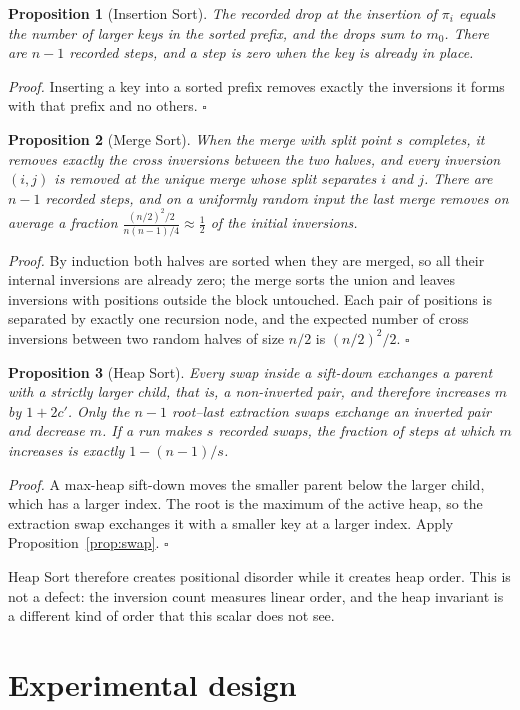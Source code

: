 \documentclass[10pt,journal]{IEEEtran}
\newtheorem{proposition}{Proposition}
\begin{document}
\begin{proposition}[Insertion Sort]
The recorded drop at the insertion of $\pi_i$ equals the number of larger keys in the sorted prefix, and the drops sum to $m_0$. There are $n-1$ recorded steps, and a step is zero when the key is already in place.
\end{proposition}
\emph{Proof.} Inserting a key into a sorted prefix removes exactly the inversions it forms with that prefix and no others. \hfill$\square$

\begin{proposition}[Merge Sort]
When the merge with split point $s$ completes, it removes exactly the cross inversions between the two halves, and every inversion $(i,j)$ is removed at the unique merge whose split separates $i$ and $j$. There are $n-1$ recorded steps, and on a uniformly random input the last merge removes on average a fraction $\tfrac{(n/2)^2/2}{n(n-1)/4}\approx\tfrac12$ of the initial inversions.
\end{proposition}
\emph{Proof.} By induction both halves are sorted when they are merged, so all their internal inversions are already zero; the merge sorts the union and leaves inversions with positions outside the block untouched. Each pair of positions is separated by exactly one recursion node, and the expected number of cross inversions between two random halves of size $n/2$ is $(n/2)^2/2$. \hfill$\square$

\begin{proposition}[Heap Sort]
Every swap inside a sift-down exchanges a parent with a strictly larger child, that is, a non-inverted pair, and therefore \emph{increases} $m$ by $1+2c'$. Only the $n-1$ root--last extraction swaps exchange an inverted pair and decrease $m$. If a run makes $s$ recorded swaps, the fraction of steps at which $m$ increases is exactly $1-(n-1)/s$.
\end{proposition}
\emph{Proof.} A max-heap sift-down moves the smaller parent below the larger child, which has a larger index. The root is the maximum of the active heap, so the extraction swap exchanges it with a smaller key at a larger index. Apply Proposition~\ref{prop:swap}. \hfill$\square$

Heap Sort therefore creates positional disorder while it creates heap order. This is not a defect: the inversion count measures linear order, and the heap invariant is a different kind of order that this scalar does not see.

\section{Experimental design}
\end{document}
